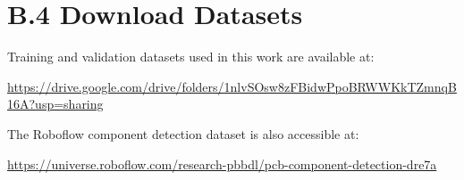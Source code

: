\documentclass[12pt,a4paper]{report}
\begin{document}
\section*{B.4 Download Datasets}
Training and validation datasets used in this work are available at:
\begin{center}
\url{https://drive.google.com/drive/folders/1nlvSOsw8zFBidwPpoBRWWKkTZmnqB16A?usp=sharing}
\end{center}

The Roboflow component detection dataset is also accessible at:
\begin{center}
\url{https://universe.roboflow.com/research-pbbdl/pcb-component-detection-dre7a}
\end{center}
\end{document}
